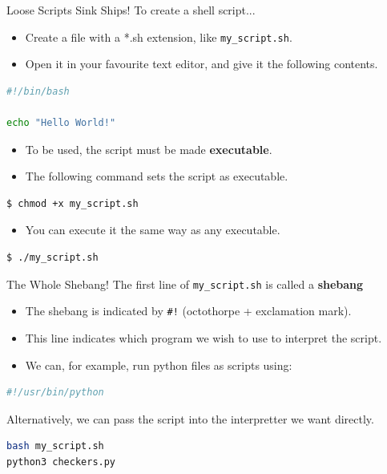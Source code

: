 \documentclass[11pt]{beamer}
\begin{document}

\begin{frame}[fragile=singleslide]{Loose Scripts Sink Ships!}
To create a shell script... 
\begin{itemize}
\item Create a file with a *.sh extension, like \texttt{my\_script.sh}.
\item Open it in your favourite text editor, and give it the following contents.
\end{itemize}
\begin{lstlisting}[style=terminal, language=bash]
#!/bin/bash

echo "Hello World!"
\end{lstlisting}
\begin{itemize}
\item To be used, the script must be made \textbf{executable}.
\item The following command sets the script as executable.
\end{itemize}
\begin{lstlisting}[style=terminal, language=bash]
$ chmod +x my_script.sh
\end{lstlisting}
\begin{itemize}
\item You can execute it the same way as any executable.
\end{itemize}
\begin{lstlisting}[style=terminal, language=bash]
$ ./my_script.sh
\end{lstlisting}
\end{frame}

\begin{frame}[fragile=singleslide]{The Whole Shebang!}
The first line of \texttt{my\_script.sh} is called a \textbf{shebang} 
\begin{itemize}
\item The shebang is indicated by \texttt{\#!} (octothorpe + exclamation mark).
\item This line indicates which program we wish to use to interpret the script.  
\item We can, for example, run python files as scripts using:
\end{itemize}
\begin{lstlisting}[style=terminal, language=bash]
#!/usr/bin/python
\end{lstlisting}
Alternatively, we can pass the script into the interpretter we want directly.   
\begin{lstlisting}[style=terminal, language=bash]
bash my_script.sh
python3 checkers.py
\end{lstlisting}
\end{frame}
\end{document}
